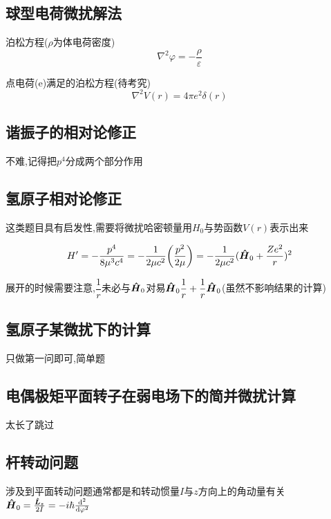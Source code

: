 \documentclass{article}
\begin{document}
        \subsection{球型电荷微扰解法}
            \begin{formal}
                泊松方程($\rho$为体电荷密度)   
                $$ \nabla^{2} \varphi = - \frac{\rho}{\varepsilon} $$

                点电荷(e)满足的泊松方程(待考究)
                $$ \nabla^{2}V(r) = 4 \pi e^2 \delta(r)$$
            \end{formal}
        
        \subsection{谐振子的相对论修正}
            不难,记得把$p^{4}$分成两个部分作用


        \subsection{氢原子相对论修正}
            这类题目具有启发性,需要将微扰哈密顿量用$H_{0}$与势函数$V(r)$表示出来

            $$ 
            H' = - \dfrac{p^{4}}{8 \mu^{3} c^{4} } = - \dfrac{1}{2\mu c^{2}} \qty(\frac{p^{2}}{2\mu}) 
            = - \dfrac{1}{2 \mu c^{2}} (\vu*{H}_{0} + \frac{Ze^{2}}{r})^{2} 
            $$

            展开的时候需要注意,$\dfrac{1}{r}$未必与$\vu*{H}_{0}$对易$ \vu*{H}_{0} \dfrac{1}{r} + \dfrac{1}{r} \vu*{H}_{0} $(虽然不影响结果的计算)
        

        \subsection{氢原子某微扰下的计算}
            只做第一问即可,简单题

        \subsection{电偶极矩平面转子在弱电场下的简并微扰计算}
            太长了跳过

        \subsection{杆转动问题}
            涉及到平面转动问题通常都是和转动惯量$I$与$z$方向上的角动量有关
                $ \vu*{H}_{0} = \frac{\vu*{L}_{z}}{2I} = - i \hbar \dv[2]{\varphi} $
\end{document}
